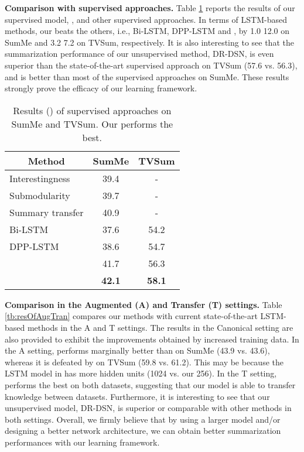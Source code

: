 \documentclass[letterpaper]{article} \usepackage{aaai18}  \usepackage{times}  \usepackage{helvet}  \usepackage{courier}  \usepackage{url}  \usepackage{graphicx}
\begin{document}
{\bf Comparison with supervised approaches.} Table \ref{tb:resOfSup} reports the results of our supervised model, , and other supervised approaches. In terms of LSTM-based methods, our  beats the others, i.e., Bi-LSTM, DPP-LSTM and , by 1.0 12.0 on SumMe and 3.2 7.2 on TVSum, respectively. It is also interesting to see that the summarization performance of our unsupervised method, DR-DSN, is even superior than the state-of-the-art supervised approach on TVSum (57.6 vs. 56.3), and is better than most of the supervised approaches on SumMe. These results strongly prove the efficacy of our learning framework.

\begin{table}[h]
\centering
\caption{Results () of supervised approaches on SumMe and TVSum. Our  performs the best.}
\label{tb:resOfSup}
\begin{tabular}{l | c | c}
\hline
\multicolumn{1}{c|}{Method} & SumMe & TVSum \\
\hline
Interestingness & 39.4 & - \\
Submodularity & 39.7 & - \\
Summary transfer & 40.9 & - \\
Bi-LSTM & 37.6 & 54.2 \\
DPP-LSTM & 38.6 & 54.7 \\
 & 41.7 & 56.3 \\
\hline \hline
 & {\bf 42.1} & {\bf 58.1} \\
\hline
\end{tabular}
\end{table}

{\bf Comparison in the Augmented (A) and Transfer (T) settings.} Table \ref{tb:resOfAugTran} compares our methods with current state-of-the-art LSTM-based methods in the A and T settings. The results in the Canonical setting are also provided to exhibit the improvements obtained by increased training data. In the A setting,  performs marginally better than  on SumMe (43.9 vs. 43.6), whereas it is defeated by  on TVSum (59.8 vs. 61.2). This may be because the LSTM model in  has more hidden units (1024 vs. our 256). In the T setting,  performs the best on both datasets, suggesting that our model is able to transfer knowledge between datasets. Furthermore, it is interesting to see that our unsupervised model, DR-DSN, is superior or comparable with other methods in both settings. Overall, we firmly believe that by using a larger model and/or designing a better network architecture, we can obtain better summarization performances with our learning framework.
\end{document}
